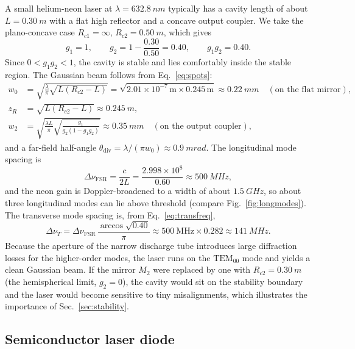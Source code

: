 \documentclass[11pt,a4paper]{article}
\newcommand{\FSR}{\Delta\nu_{\mathrm{FSR}}}
\begin{document}
	A small helium-neon laser at $\lambda=\SI{632.8}{nm}$ typically has a cavity length of about $L=\SI{0.30}{m}$ with a flat high reflector and a concave output coupler. We take the plano-concave case $R_{c1}=\infty$, $R_{c2}=\SI{0.50}{m}$, which gives
	\begin{equation}
		g_1=1,\qquad g_2=1-\frac{0.30}{0.50}=0.40,\qquad g_1g_2=0.40.
	\end{equation}
	Since $0<g_1g_2<1$, the cavity is stable and lies comfortably inside the stable region. The Gaussian beam follows from Eq.~\eqref{eq:spots}:
	\begin{align*}
		w_0 &= \sqrt{\frac{\lambda}{\pi}\sqrt{L(R_{c2}-L)}}=\sqrt{2.01\times10^{-7}\,\mathrm{m}\times0.245\,\mathrm{m}}\approx\SI{0.22}{mm}\quad(\text{on the flat mirror}),\\
		z_R &= \sqrt{L(R_{c2}-L)}\approx\SI{0.245}{m},\\
		w_2 &= \sqrt{\frac{\lambda L}{\pi}\sqrt{\frac{g_1}{g_2(1-g_1g_2)}}}\approx\SI{0.35}{mm}\quad(\text{on the output coupler}),
	\end{align*}
	and a far-field half-angle $\theta_{\mathrm{div}}=\lambda/(\pi w_0)\approx\SI{0.9}{mrad}$. The longitudinal mode spacing is
	\begin{equation}
		\FSR=\frac{c}{2L}=\frac{2.998\times10^{8}}{0.60}\approx\SI{500}{MHz},
	\end{equation}
	and the neon gain is Doppler-broadened to a width of about $\SI{1.5}{GHz}$, so about three longitudinal modes can lie above threshold (compare Fig.~\ref{fig:longmodes}). The transverse mode spacing is, from Eq.~\eqref{eq:transfreq},
	\begin{equation}
		\Delta\nu_T=\FSR\,\frac{\arccos\sqrt{0.40}}{\pi}\approx 500\ \mathrm{MHz}\times0.282\approx\SI{141}{MHz}.
	\end{equation}
	Because the aperture of the narrow discharge tube introduces large diffraction losses for the higher-order modes, the laser runs on the $\mathrm{TEM}_{00}$ mode and yields a clean Gaussian beam. If the mirror $M_2$ were replaced by one with $R_{c2}=\SI{0.30}{m}$ (the hemispherical limit, $g_2=0$), the cavity would sit on the stability boundary and the laser would become sensitive to tiny misalignments, which illustrates the importance of Sec.~\ref{sec:stability}.
	
	\subsection{Semiconductor laser diode}
	
\end{document}
